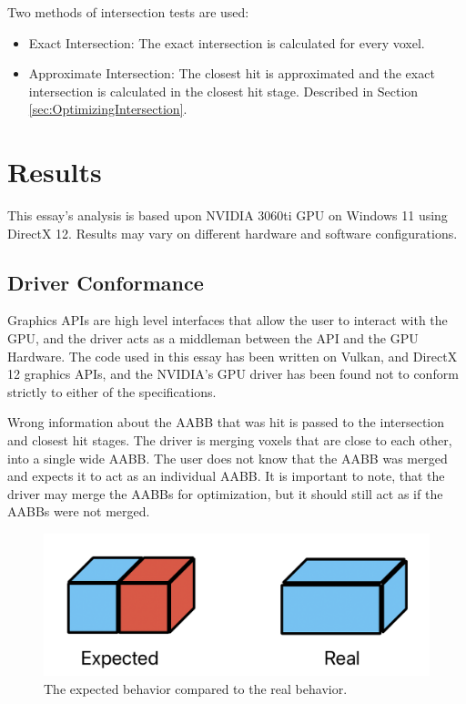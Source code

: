 \documentclass[12pt]{article}
\begin{document}
Two methods of intersection tests are used:
\begin{itemize}
    \itemsep0em
    \item Exact Intersection: The exact intersection is calculated for every voxel.
    \item Approximate Intersection: The closest hit is approximated and the exact intersection is calculated in the closest hit stage.
          Described in Section \ref{sec:OptimizingIntersection}.
\end{itemize}

\section{Results}

This essay's analysis is based upon NVIDIA 3060ti GPU on Windows 11 using DirectX 12.
Results may vary on different hardware and software configurations.

\subsection{Driver Conformance}

Graphics APIs are high level interfaces that allow the user to interact with the GPU,
and the driver acts as a middleman between the API and the GPU Hardware.
The code used in this essay has been written on Vulkan, and DirectX 12 graphics APIs,
and the NVIDIA's GPU driver has been found not to conform strictly to either of the specifications.

Wrong information about the AABB that was hit is passed to the intersection and closest hit stages.
The driver is merging voxels that are close to each other, into a single wide AABB.
The user does not know that the AABB was merged and expects it to act as an individual AABB.
It is important to note, that the driver may merge the AABBs for optimization, but it should still act as if the AABBs were not merged.

\begin{figure}[H]
    \begin{center}
        \includegraphics[scale=0.5]{Voxel-Merging}
    \end{center}
    \caption{
        The expected behavior compared to the real behavior.
    }
    \label{fig:Voxel-Merging}
\end{figure}
\end{document}
